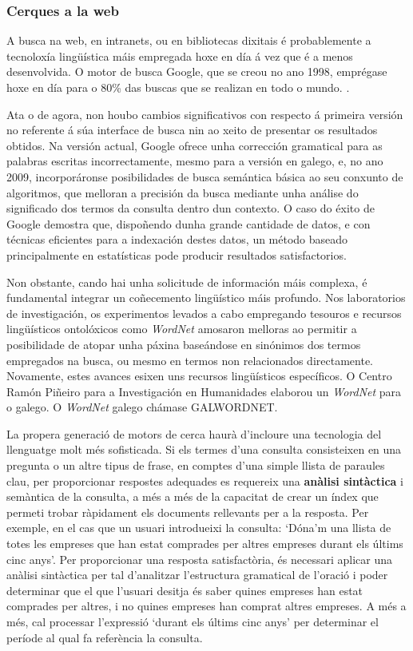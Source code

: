\begin{multicols}{2}
\subsubsection{Cerques a la web}

  A busca na web, en intranets, ou en bibliotecas dixitais é probablemente a tecnoloxía lingüística máis empregada hoxe en día á vez que é a menos desenvolvida. O motor de busca Google, que se creou no ano 1998, emprégase hoxe en día para o 80\% das buscas que se realizan en todo o mundo. \cite{CAT-Nota22}. 

Ata o de agora, non houbo cambios significativos con respecto á primeira versión no referente á súa interface de busca nin ao xeito de presentar os resultados obtidos. Na versión actual, Google ofrece unha corrección gramatical para as palabras escritas incorrectamente, mesmo para a versión en galego, e, no ano 2009, incorporáronse posibilidades de busca semántica básica ao seu conxunto de algoritmos\cite{CAT-Nota23}, que melloran a precisión da busca mediante unha análise do significado dos termos da consulta dentro dun contexto. O caso do éxito de Google demostra que, dispoñendo dunha grande cantidade de datos, e con técnicas eficientes para a indexación destes datos, un método baseado principalmente en estatísticas pode producir resultados satisfactorios. 

Non obstante, cando hai unha solicitude de información máis complexa, é fundamental integrar un coñecemento lingüístico máis profundo. Nos laboratorios de investigación, os experimentos levados a cabo empregando tesouros e recursos lingüísticos ontolóxicos como \textit{WordNet} amosaron melloras ao permitir a posibilidade de atopar unha páxina baseándose en sinónimos dos termos empregados na busca, ou mesmo en termos non relacionados directamente. Novamente, estes avances esixen uns recursos lingüísticos específicos. O Centro Ramón Piñeiro para a Investigación en Humanidades\cite{GAL-Nota24} elaborou un \textit{WordNet} para o galego. O \textit{WordNet} galego chámase GALWORDNET.

La propera generació de motors de cerca haurà d’incloure una tecnologia del llenguatge molt més sofisticada. Si els termes d’una consulta consisteixen en una pregunta o un altre tipus de frase, en comptes d’una simple llista de paraules clau, per proporcionar respostes adequades es requereix una \textbf{anàlisi sintàctica} i semàntica de la consulta, a més  a més de la capacitat de crear un índex que permeti trobar ràpidament els documents rellevants per a la resposta. Per exemple, en el cas que un usuari introdueixi la consulta: ‘Dóna’m una llista de totes les empreses que han estat comprades per altres empreses durant els últims cinc anys’. Per proporcionar una resposta satisfactòria, és necessari aplicar una anàlisi sintàctica per tal d’analitzar l’estructura gramatical de l’oració i poder determinar que el que l’usuari desitja és saber quines empreses han estat comprades per altres, i no quines empreses han comprat altres empreses. A més a més, cal processar  l’expressió ‘durant els últims cinc anys’ per determinar el període al qual fa referència la consulta. 


\end{multicols}
